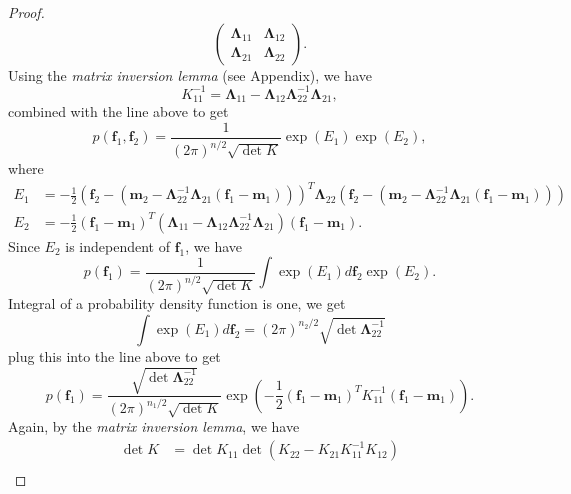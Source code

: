 \documentclass[11pt,a4paper]{article}
\theoremstyle{definition}
\numberwithin{equation}{section}
\let\vec\mathbf
\begin{document}
\begin{proof}
\begin{equation*}
		\begin{pmatrix}
		\vec\Lambda_{11} & \vec\Lambda_{12}\\
		\vec\Lambda_{21} & \vec\Lambda_{22}
		\end{pmatrix}.
		\end{equation*}
		Using the \textit{matrix inversion lemma} (see Appendix), we have
		\begin{equation*} \label{}
		K_{11}^{-1} = \vec\Lambda_{11}-\vec\Lambda_{12}\vec\Lambda_{22}^{-1}\vec\Lambda_{21},
		\end{equation*}
		combined with the line above to get
		\begin{equation*} \label{}
		p(\vec f_1,\vec f_2) = \frac{1}{(2\pi)^{n/2}\sqrt{\det K}}\exp{(E_1)}\exp{(E_2)},
		\end{equation*}
		where
		\begin{equation*} \label{}
		\begin{split}
		E_1 &=-\frac{1}{2}\left(\vec f_2-(\vec m_2 - \vec\Lambda_{22}^{-1} \vec\Lambda_{21}(\vec f_1 - \vec m_1))\right)^T\vec\Lambda_{22}\left(\vec f_2-(\vec m_2 - \vec\Lambda_{22}^{-1} \vec\Lambda_{21}(\vec f_1 - \vec m_1))\right)\\
		E_2 & = -\frac{1}{2}\left(\vec f_1 - \vec m_1\right)^T\left(\vec\Lambda_{11}-\vec\Lambda_{12}\vec\Lambda_{22}^{-1}\vec\Lambda_{21}\right)\left(\vec f_1 - \vec m _1 \right).
		\end{split}
		\end{equation*}
		Since $E_2$ is independent of $\vec f_1$, we have
		\begin{equation*} \label{}
		p(\vec f_1) = \frac{1}{(2\pi)^{n/2}\sqrt{\det K}}\int \exp{(E_1)}d\vec f_2\exp{(E_2)}.
		\end{equation*}
		Integral of a probability density function is one, we get
		\begin{equation*} \label{}
		\int \exp{(E_1)}d\vec f_2 = (2\pi)^{n_2/2}\sqrt{\det \vec \Lambda_{22}^{-1}}
		\end{equation*}
		plug this into the line above to get
		\begin{equation*} \label{}
		p(\vec f_1) = \frac{\sqrt{\det \vec \Lambda_{22}^{-1}}}{(2\pi)^{n_1/2}\sqrt{\det K}} \exp{\left(-\frac{1}{2}\left(\vec f_1 - \vec m_1\right)^TK_{11}^{-1}\left(\vec f_1 - \vec m _1 \right)\right)}.
		\end{equation*}
		Again, by the \textit{matrix inversion lemma}, we have
		\begin{equation*} \label{}
		\begin{split}
		\det K&= \det K_{11}\det(K_{22}-K_{21}K_{11}^{-1}K_{12})\\

\end{split}
\end{equation*}
\end{proof}
\end{document}
